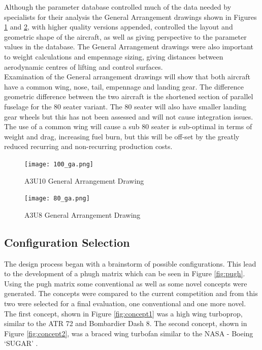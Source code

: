 \documentclass[11pt]{article}
\begin{document}
Although the parameter database controlled much of the data needed by specialists for their analysis the General Arrangement drawings shown in Figures \ref{fig:ga100} and \ref{fig:ga80}, with higher quality versions appended, controlled the layout and geometric shape of the aircraft, as well as giving perspective to the parameter values in the database. The General Arrangement drawings were also important to weight calculations and empennage sizing, giving distances between aerodynamic centres of lifting and control surfaces. \\
Examination of the General arrangement drawings will show that both aircraft have a common wing, nose, tail, empennage and landing gear. The difference geometric difference between the two aircraft is the shortened section of parallel fuselage for the 80 seater variant. The 80 seater will also have smaller landing gear wheels but this has not been assessed and will not cause integration issues. The use of a common wing will cause a sub 80 seater is sub-optimal in terms of weight and drag, increasing fuel burn, but this will be off-set by the greatly reduced recurring and non-recurring production costs.

\FloatBarrier
\begin{figure}[!h]

\centering
\texttt{[image: 100\_ga.png]}
\caption{A3U10 General Arrangement Drawing}
\label{fig:ga100}
\end{figure}


\begin{figure}[!h]
\centering
\texttt{[image: 80\_ga.png]}
\caption{A3U8 General Arrangement Drawing}
\label{fig:ga80}
\end{figure}
\FloatBarrier

\subsection{Configuration Selection}

The design process began with a brainstorm of possible configurations. This lead to the development of a phugh matrix which can be seen in Figure \ref{fig:pugh}. Using the pugh matrix some conventional as well as some novel concepts were generated. The concepts were compared to the current competition and from this two were selected for a final evaluation, one conventional and one more novel. The first concept, shown in Figure \ref{fig:concept1} was a high wing turboprop, similar to the ATR 72 and Bombardier Dash 8. The second concept, shown in Figure \ref{fig:concept2}, was a braced wing turbofan similar to the NASA - Boeing ‘SUGAR’ \cite{SUGAR}.
\end{document}
